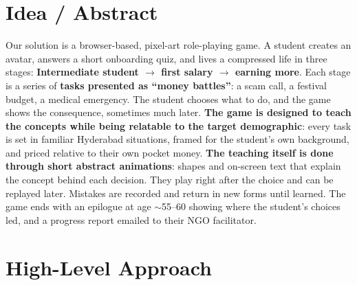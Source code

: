 \documentclass[10pt,a4paper]{article}
\begin{document}
\section{Idea / Abstract}
\colorbox{accsoft}{\parbox{\dimexpr\textwidth-2\fboxsep}{\small
Our solution is a browser-based, pixel-art role-playing game. A student creates an avatar, answers a short onboarding quiz, and lives a compressed life in three stages: \textbf{Intermediate student $\rightarrow$ first salary $\rightarrow$ earning more}. Each stage is a series of \textbf{tasks presented as ``money battles''}: a scam call, a festival budget, a medical emergency. The student chooses what to do, and the game shows the consequence, sometimes much later.
\textbf{The game is designed to teach the concepts while being relatable to the target demographic}: every task is set in familiar Hyderabad situations, framed for the student's own background, and priced relative to their own pocket money.
\textbf{The teaching itself is done through short abstract animations}: shapes and on-screen text that explain the concept behind each decision. They play right after the choice and can be replayed later.
Mistakes are recorded and return in new forms until learned. The game ends with an epilogue at age $\sim$55--60 showing where the student's choices led, and a progress report emailed to their NGO facilitator.}}

\section{High-Level Approach}
\end{document}
